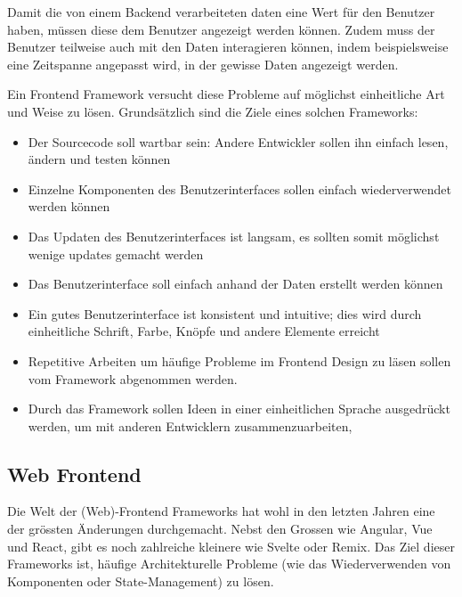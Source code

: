 Damit die von einem Backend verarbeiteten daten eine Wert für den Benutzer haben, müssen diese
dem Benutzer angezeigt werden können. Zudem muss der Benutzer teilweise auch mit den
Daten interagieren können, indem beispielsweise eine Zeitspanne angepasst wird, in
der gewisse Daten angezeigt werden. \parencite{anokhina_2019}

Ein Frontend Framework versucht diese Probleme auf möglichst einheitliche Art und Weise
zu lösen. Grundsätzlich sind die Ziele eines solchen Frameworks: \parencite{do-i-need-a-frontend-fwk}

\begin{itemize}
    \item Der Sourcecode soll wartbar sein: Andere Entwickler sollen ihn einfach lesen, ändern und testen können
    \item Einzelne Komponenten des Benutzerinterfaces sollen einfach wiederverwendet werden können
    \item Das Updaten des Benutzerinterfaces ist langsam, es sollten somit möglichst wenige updates gemacht werden
    \item Das Benutzerinterface soll einfach anhand der Daten erstellt werden können
    \item Ein gutes Benutzerinterface ist konsistent und intuitive; dies wird durch einheitliche Schrift, Farbe, Knöpfe und andere Elemente erreicht
    \item Repetitive Arbeiten um häufige Probleme im Frontend Design zu läsen sollen vom Framework abgenommen werden.
    \item Durch das Framework sollen Ideen in einer einheitlichen Sprache ausgedrückt werden, um mit anderen Entwicklern zusammenzuarbeiten,
\end{itemize}

\subsection{Web Frontend}

Die Welt der (Web)-Frontend Frameworks hat wohl in den letzten Jahren eine der grössten Änderungen
durchgemacht. Nebst den Grossen wie Angular, Vue und React, gibt es noch zahlreiche kleinere wie Svelte oder
Remix. Das Ziel dieser Frameworks ist, häufige Architekturelle Probleme (wie das Wiederverwenden von Komponenten
oder State-Management) zu lösen.\cite{do-i-need-a-frontend-fwk}



